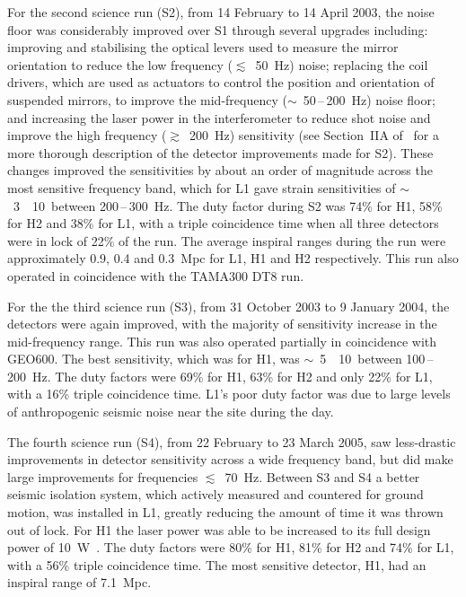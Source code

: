 For the second science run (S2), from 14 February to 14 April 2003, the noise floor was considerably improved 
over S1 through several upgrades including: improving and stabilising the optical levers used to measure the 
mirror orientation to reduce the low frequency ($\lesssim$~50~Hz) noise; replacing the coil drivers, which 
are used as actuators to control the position and orientation of suspended mirrors, to improve the
mid-frequency ($\sim$~50\,--\,200~Hz) noise floor; and increasing the laser power in the interferometer to 
reduce shot noise and improve the high frequency ($\gtrsim$~200~Hz) sensitivity (see Section~IIA 
of~\cite{Abbott:2005a} for a more thorough description of the detector improvements made for S2). These 
changes improved the sensitivities by about an order of magnitude across the most sensitive frequency band, 
which for L1 gave strain sensitivities of $\sim$~3~\texttimes~10~\Hz between 200\,--\,300~Hz. The 
duty factor during S2 was 74\% for H1, 58\% for H2 and 38\% for L1, with a triple coincidence time when all 
three detectors were in lock of 22\% of the run. The average inspiral ranges during the run were approximately 
0.9, 0.4 and 0.3~Mpc for L1, H1 and H2 respectively. This run also operated in coincidence with the TAMA300 
DT8 run. 

For the the third science run (S3), from 31 October 2003 to 9 January 2004, the detectors were again 
improved, with the majority of sensitivity increase in the mid-frequency range. This run was also operated 
partially in coincidence with GEO600. The best sensitivity, which was for H1, was
$\sim$~5~\texttimes~10~\Hz between 100\,--\,200~Hz. The duty factors were 69\% for H1, 63\% for H2 
and only 22\% for L1, with a 16\% triple coincidence time. L1's poor duty factor was due to large levels of 
anthropogenic seismic noise near the site during the day.

The fourth science run (S4), from 22 February to 23 March 2005, saw less-drastic improvements in detector 
sensitivity across a wide frequency band, but did make large improvements for frequencies $\lesssim$~70~Hz. 
Between S3 and S4 a better seismic isolation system, which actively measured and countered for ground
motion, was installed in L1, greatly reducing the amount of time it was thrown out of lock. For H1 the laser 
power was able to be increased to its full design power of 10~W~\cite{Abbott:2007b}. The duty factors were 
80\% for H1, 81\% for H2 and 74\% for L1, with a 56\% triple coincidence time. The most sensitive
detector, H1, had an inspiral range of 7.1~Mpc.


